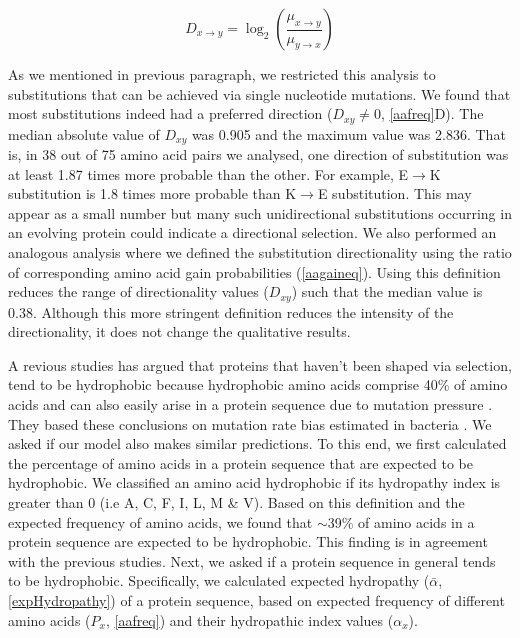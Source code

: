 \documentclass[12pt,a4paper]{article}
\begin{document}
\begin{equation}
\textit{D}_{x\to y} = \log_2\left(\frac{\mu_{x\to y}}{\mu_{y\to x}}\right)
\label{directionality}
\end{equation}

As we mentioned in previous paragraph, we restricted this analysis to substitutions that can be achieved via single nucleotide mutations. We found that most substitutions indeed had a preferred direction ($\textit{D}_{xy} \neq 0$,  \autoref{aafreq}{\color{blue}D}). The median absolute value of $\textit{D}_{xy}$ was 0.905 and the maximum value was 2.836. That is, in 38 out of 75 amino acid pairs we analysed, one direction of substitution was at least 1.87 times more probable than the other. For example, E$\to$K substitution is 1.8 times more probable than K$\to$E substitution. This may appear as a small number but many such unidirectional substitutions occurring in an evolving protein could indicate a directional selection. We also performed an analogous analysis where we defined the substitution directionality using the ratio of corresponding amino acid gain probabilities (\autoref{aagaineq}). Using this definition reduces the range of directionality values ($\textit{D}_{xy}$) such that the median value is 0.38. Although this more stringent definition reduces the intensity of the directionality, it does not change the qualitative results. 


A revious studies has argued that proteins that haven't been shaped via selection, tend to be hydrophobic because hydrophobic amino acids comprise 40\% of amino acids and can also easily arise in a protein sequence due to mutation pressure \citep{hydrophobicRatchet}. They based these conclusions on mutation rate bias estimated in bacteria \citep{bacteriaMutbias}. We asked if our model also makes similar predictions. To this end, we first calculated the percentage of amino acids in a protein sequence that are expected to be hydrophobic. We classified an amino acid hydrophobic if its hydropathy index \citep{hydropathy} is greater than 0 (i.e A, C, F, I, L, M \& V). Based on this definition and the expected frequency of amino acids, we found that $\sim$39\% of amino acids in a protein sequence are expected to be hydrophobic. This finding is in agreement with the previous studies. Next, we asked if a protein sequence in general tends to be hydrophobic. Specifically, we calculated expected hydropathy ($\bar{\alpha}$, \autoref{expHydropathy}) of a protein sequence, based on expected frequency of different amino acids ($P_x$, \autoref{aafreq}) and their hydropathic index values ($\alpha_x$). 
\end{document}
